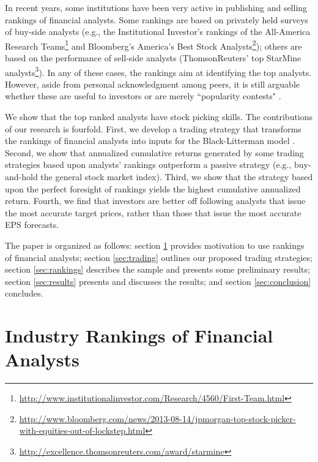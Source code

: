 \documentclass{article}\usepackage[]{graphicx}\usepackage[]{color}
\begin{document}
In recent years, some institutions have been very active in publishing and  selling  rankings of financial analysts. Some rankings  are based on privately held surveys of  buy-side analysts (e.g., the Institutional Investor's rankings of the All-America Research Teams\footnote{\url{http://www.institutionalinvestor.com/Research/4560/First-Team.html}} and Bloomberg's America's Best Stock Analysts\footnote{\sloppy \url{http://www.bloomberg.com/news/2013-08-14/jpmorgan-top-stock-picker-with-equities-out-of-lockstep.html}}); others are based on the performance of sell-side analysts (ThomsonReuters' top StarMine analysts\footnote{\url{http://excellence.thomsonreuters.com/award/starmine}}). In any of these cases, the rankings aim at identifying the top analysts. However, aside from personal acknowledgment among peers, it is still arguable whether these are useful to investors \citep{desai2000ass} or are merely ``popularity contests" \citep{emery2009}. %


We show that the top ranked analysts have stock picking skills. The contributions of our research is fourfold. First, we develop a trading strategy that transforms the rankings of financial analysts into inputs for the Black-Litterman model \citep{black1992}. Second, we show that annualized cumulative returns generated by some trading strategies  based upon analysts' rankings outperform a passive strategy (e.g., buy-and-hold the general stock market index). Third, we show that the strategy based upon the perfect foresight of rankings yields the highest cumulative annualized return. Fourth, we find that investors  are better off following analysts that issue the most accurate target prices, rather than those that issue the most accurate EPS forecasts.



The paper is organized as follows: section \ref{sec:ranking} provides motivation to use rankings of financial analysts; section \ref{sec:trading} outlines our proposed  trading strategies; section \ref{sec:rankings} describes the sample and presents some preliminary results; section \ref{sec:results} presents and discusses the results; and section \ref{sec:conclusion} concludes.

\section{Industry Rankings of Financial Analysts}
\label{sec:ranking}
\end{document}
